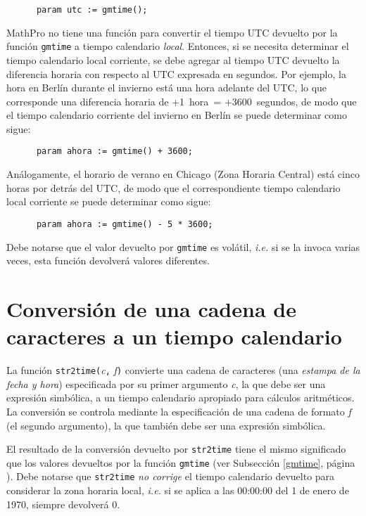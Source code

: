 \documentclass[11pt,spanish]{report}
\begin{document}
\begin{verbatim}
      param utc := gmtime();
\end{verbatim}

MathPro no tiene una función para convertir el tiempo UTC devuelto por la función {\tt gmtime} a tiempo calendario {\it local}. Entonces, si se necesita determinar el tiempo calendario local corriente, se debe agregar al tiempo UTC devuelto la diferencia horaria con respecto al UTC expresada en segundos. Por ejemplo, la hora en Berlín durante el invierno está una hora adelante del UTC, lo que corresponde una diferencia horaria de +1~hora~= +3600~segundos, de modo que el tiempo calendario corriente del invierno en Berlín se puede determinar como sigue:

\begin{verbatim}
      param ahora := gmtime() + 3600;
\end{verbatim}

\noindent Análogamente, el horario de verano en Chicago (Zona Horaria Central) está cinco horas por detrás del UTC, de modo que el correspondiente tiempo calendario local corriente se puede determinar como sigue:

\begin{verbatim}
      param ahora := gmtime() - 5 * 3600;
\end{verbatim}

Debe notarse que el valor devuelto por {\tt gmtime} es volátil, {\it i.e.} si se la invoca varias veces, esta función devolverá valores diferentes.

\section{Conversión de una cadena de caracteres a un tiempo calendario}
\label{str2time}

La función {\tt str2time(}{\it c}{\tt,} {\it f}{\tt)} convierte una cadena de caracteres (una {\it estampa de la fecha y hora}) especificada por su primer argumento {\it c}, la que debe ser una expresión simbólica, a un tiempo calendario apropiado para cálculos aritméticos. La conversión se controla mediante la especificación de una cadena de formato {\it f} (el segundo argumento), la que también debe ser una expresión simbólica.

El resultado de la conversión devuelto por {\tt str2time} tiene el mismo significado que los valores devueltos por la función {\tt gmtime} (ver Subsección \ref{gmtime}, página \pageref{gmtime}). Debe notarse que {\tt str2time} {\it no corrige} el tiempo calendario devuelto para considerar la zona horaria local, {\it i.e.} si se aplica a las 00:00:00 del 1 de enero de 1970, siempre devolverá 0.
\end{document}
